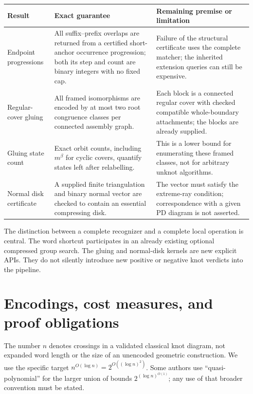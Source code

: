 \begin{longtable}{@{}>{\raggedright\arraybackslash}p{}>{\raggedright\arraybackslash}p{}>{\raggedright\arraybackslash}p{}@{}}
\toprule
Result & Exact guarantee & Remaining premise or limitation\\
\midrule
Endpoint progressions & All suffix--prefix overlaps are returned from a
certified short-anchor occurrence progression; both its step and count are
binary integers with no fixed cap. & Failure of the structural certificate
uses the complete matcher; the inherited extension queries can still be
expensive.\\
Regular-cover gluing & All framed isomorphisms are encoded by at most two
root congruence classes per connected assembly graph. & Each block is a
connected regular cover with checked compatible whole-boundary attachments;
the blocks are already supplied.\\
Gluing state count & Exact orbit counts, including $m^\beta$ for cyclic
covers, quantify states left after relabelling. & This is a lower bound for
enumerating these framed classes, not for arbitrary unknot algorithms.\\
Normal disk certificate & A supplied finite triangulation and binary normal
vector are checked to contain an essential compressing disk. & The vector
must satisfy the extreme-ray condition; correspondence with a given PD
diagram is not asserted.\\
\bottomrule
\end{longtable}

The distinction between a complete recognizer and a complete local operation
is central. The word shortcut participates in an already existing optional
compressed group search. The gluing and normal-disk kernels are new explicit
APIs. They do not silently introduce new positive or negative knot verdicts
into the pipeline.

\section{Encodings, cost measures, and proof obligations}
\label{sec:models}

The number $n$ denotes crossings in a validated classical knot diagram,
not expanded word length or the size of an unencoded geometric construction.
We use the specific target $n^{O(\log n)}=2^{O((\log n)^2)}$. Some authors use
``quasi-polynomial'' for the larger union of bounds
$2^{(\log n)^{O(1)}}$; any use of that broader convention must be stated.

